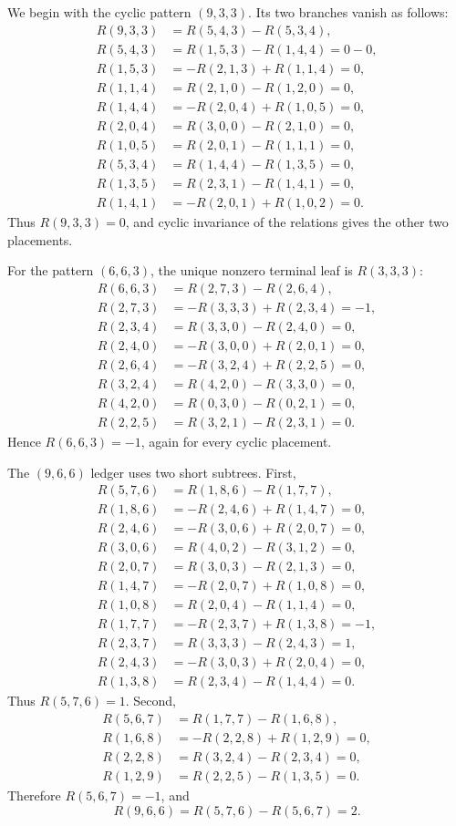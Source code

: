 \documentclass[11pt]{article}
\theoremstyle{definition}
\begin{document}
We begin with the cyclic pattern $(9,3,3)$. Its two branches vanish as follows:
\begin{align*}
R(9,3,3)
&=R(5,4,3)-R(5,3,4),\\
R(5,4,3)
&=R(1,5,3)-R(1,4,4)=0-0,\\
R(1,5,3)
&=-R(2,1,3)+R(1,1,4)=0,\\
R(1,1,4)
&=R(2,1,0)-R(1,2,0)=0,\\
R(1,4,4)
&=-R(2,0,4)+R(1,0,5)=0,\\
R(2,0,4)
&=R(3,0,0)-R(2,1,0)=0,\\
R(1,0,5)
&=R(2,0,1)-R(1,1,1)=0,\\
R(5,3,4)
&=R(1,4,4)-R(1,3,5)=0,\\
R(1,3,5)
&=R(2,3,1)-R(1,4,1)=0,\\
R(1,4,1)
&=-R(2,0,1)+R(1,0,2)=0.
\end{align*}
Thus $R(9,3,3)=0$, and cyclic invariance of the relations gives the other two placements.

For the pattern $(6,6,3)$, the unique nonzero terminal leaf is $R(3,3,3)$:
\begin{align*}
R(6,6,3)
&=R(2,7,3)-R(2,6,4),\\
R(2,7,3)
&=-R(3,3,3)+R(2,3,4)=-1,\\
R(2,3,4)
&=R(3,3,0)-R(2,4,0)=0,\\
R(2,4,0)
&=-R(3,0,0)+R(2,0,1)=0,\\
R(2,6,4)
&=-R(3,2,4)+R(2,2,5)=0,\\
R(3,2,4)
&=R(4,2,0)-R(3,3,0)=0,\\
R(4,2,0)
&=R(0,3,0)-R(0,2,1)=0,\\
R(2,2,5)
&=R(3,2,1)-R(2,3,1)=0.
\end{align*}
Hence $R(6,6,3)=-1$, again for every cyclic placement.

The $(9,6,6)$ ledger uses two short subtrees. First,
\begin{align*}
R(5,7,6)
&=R(1,8,6)-R(1,7,7),\\
R(1,8,6)
&=-R(2,4,6)+R(1,4,7)=0,\\
R(2,4,6)
&=-R(3,0,6)+R(2,0,7)=0,\\
R(3,0,6)
&=R(4,0,2)-R(3,1,2)=0,\\
R(2,0,7)
&=R(3,0,3)-R(2,1,3)=0,\\
R(1,4,7)
&=-R(2,0,7)+R(1,0,8)=0,\\
R(1,0,8)
&=R(2,0,4)-R(1,1,4)=0,\\
R(1,7,7)
&=-R(2,3,7)+R(1,3,8)=-1,\\
R(2,3,7)
&=R(3,3,3)-R(2,4,3)=1,\\
R(2,4,3)
&=-R(3,0,3)+R(2,0,4)=0,\\
R(1,3,8)
&=R(2,3,4)-R(1,4,4)=0.
\end{align*}
Thus $R(5,7,6)=1$. Second,
\begin{align*}
R(5,6,7)
&=R(1,7,7)-R(1,6,8),\\
R(1,6,8)
&=-R(2,2,8)+R(1,2,9)=0,\\
R(2,2,8)
&=R(3,2,4)-R(2,3,4)=0,\\
R(1,2,9)
&=R(2,2,5)-R(1,3,5)=0.
\end{align*}
Therefore $R(5,6,7)=-1$, and
\[
R(9,6,6)=R(5,7,6)-R(5,6,7)=2.
\]
\end{document}
